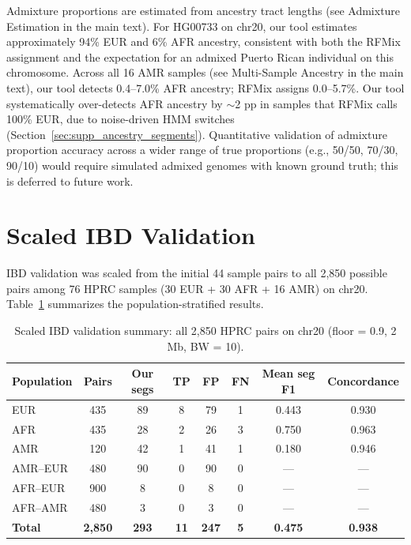 \documentclass[11pt]{article}
\begin{document}
Admixture proportions are estimated from ancestry tract lengths (see Admixture Estimation in the main text). For HG00733 on chr20, our tool estimates approximately 94\% EUR and 6\% AFR ancestry, consistent with both the RFMix assignment and the expectation for an admixed Puerto Rican individual on this chromosome. Across all 16 AMR samples (see Multi-Sample Ancestry in the main text), our tool detects 0.4--7.0\% AFR ancestry; RFMix assigns 0.0--5.7\%. Our tool systematically over-detects AFR ancestry by $\sim$2 pp in samples that RFMix calls 100\% EUR, due to noise-driven HMM switches (Section~\ref{sec:supp_ancestry_segments}). Quantitative validation of admixture proportion accuracy across a wider range of true proportions (e.g., 50/50, 70/30, 90/10) would require simulated admixed genomes with known ground truth; this is deferred to future work.

\section{Scaled IBD Validation}
\label{sec:supp_scaled_ibd}

IBD validation was scaled from the initial 44 sample pairs to all 2,850 possible pairs among 76 HPRC samples (30 EUR + 30 AFR + 16 AMR) on chr20. Table~\ref{tab:scaled_summary} summarizes the population-stratified results.

\begin{table}[ht]
\centering
\caption{Scaled IBD validation summary: all 2,850 HPRC pairs on chr20 (floor = 0.9, 2 Mb, BW = 10).}
\label{tab:scaled_summary}
\begin{tabular}{lccccccc}
\hline
\textbf{Population} & \textbf{Pairs} & \textbf{Our segs} & \textbf{TP} & \textbf{FP} & \textbf{FN} & \textbf{Mean seg F1} & \textbf{Concordance} \\
\hline
EUR & 435 & 89 & 8 & 79 & 1 & 0.443 & 0.930 \\
AFR & 435 & 28 & 2 & 26 & 3 & 0.750 & 0.963 \\
AMR & 120 & 42 & 1 & 41 & 1 & 0.180 & 0.946 \\
AMR--EUR & 480 & 90 & 0 & 90 & 0 & --- & --- \\
AFR--EUR & 900 & 8 & 0 & 8 & 0 & --- & --- \\
AFR--AMR & 480 & 3 & 0 & 3 & 0 & --- & --- \\
\hline
\textbf{Total} & \textbf{2,850} & \textbf{293} & \textbf{11} & \textbf{247} & \textbf{5} & \textbf{0.475} & \textbf{0.938} \\
\hline
\end{tabular}
\end{table}
\end{document}
